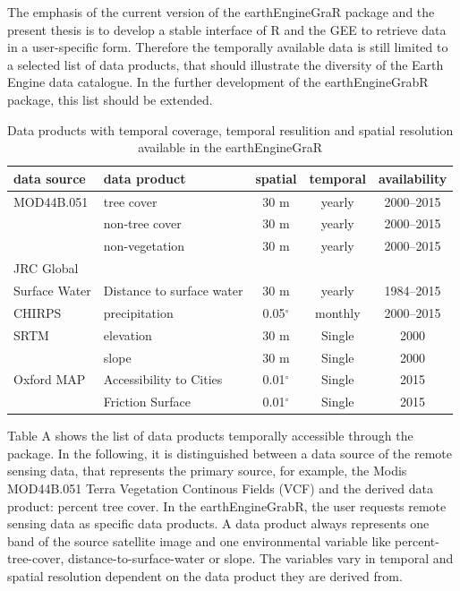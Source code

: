 The emphasis of the current version of the earthEngineGraR package and the present thesis is to develop a stable interface of R and the GEE to retrieve data in a user-specific form. Therefore the temporally available data is still limited to a selected list of data products, that should illustrate the diversity of the Earth Engine data catalogue. In the further development of the earthEngineGrabR package, this list should be extended.

\begin{table}[h]
	\begin{tabularx}{\textwidth}{llccc}
		\hline
		\textbf{data source} & \textbf{data product} & \textbf{spatial} & \textbf{temporal} & \textbf{availability}\\
		\hline
		
		MOD44B.051 & tree cover  & 30 m & yearly & 2000–2015 \\
		
		& non-tree cover  & 30 m & yearly & 2000–2015 \\
		
		& non-vegetation  & 30 m & yearly & 2000–2015 \\
		
		JRC Global \\ Surface Water  & Distance to surface water & 30 m & yearly & 1984–2015 \\
		
		CHIRPS & precipitation & 0.05$^\circ$ & monthly & 2000–2015\\
		
		SRTM & elevation  & 30 m & Single & 2000\\
		& slope  & 30 m & Single & 2000\\
		
		Oxford MAP & Accessibility to Cities  & 0.01$^\circ$ & Single & 2015\\
		
		& Friction Surface  & 0.01$^\circ$  & Single & 2015\\
		
		\hline
	\end{tabularx}
	\caption{Data products with temporal coverage, temporal resulition and spatial resolution available in the earthEngineGraR}
\end{table}

Table A shows the list of data products temporally accessible through the package. In the following, it is distinguished between a data source of the remote sensing data, that represents the primary source, for example, the Modis MOD44B.051 Terra Vegetation Continous Fields (VCF) and the derived data product: percent tree cover. In the earthEngineGrabR, the user requests remote sensing data as specific data products. A data product always represents one band of the source satellite image and one environmental variable like percent-tree-cover, distance-to-surface-water or slope.
The variables vary in temporal and spatial resolution dependent on the data product they are derived from. 

